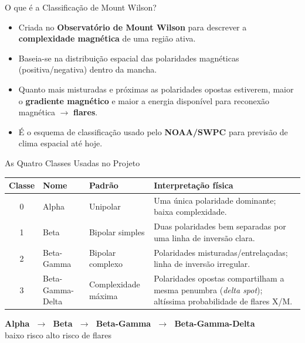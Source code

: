 \documentclass[aspectratio=169]{beamer}
\begin{document}
\begin{frame}{O que é a Classificação de Mount Wilson?}
  \begin{itemize}
    \item Criada no \textbf{Observatório de Mount Wilson} para descrever a \textbf{complexidade magnética} de uma região ativa.
    \item Baseia-se na distribuição espacial das polaridades magnéticas (positiva/negativa) dentro da mancha.
    \item Quanto mais misturadas e próximas as polaridades opostas estiverem, maior o \textbf{gradiente magnético} e maior a energia disponível para reconexão magnética $\rightarrow$ \textbf{flares}.
    \item É o esquema de classificação usado pelo \textbf{NOAA/SWPC} para previsão de clima espacial até hoje.
  \end{itemize}
\end{frame}

\begin{frame}{As Quatro Classes Usadas no Projeto}
  \begin{table}
    \small
    \begin{tabular}{c l l p{5.2cm}}
      \toprule
      \textbf{Classe} & \textbf{Nome} & \textbf{Padrão} & \textbf{Interpretação física} \\
      \midrule
      0 & Alpha & Unipolar & Uma única polaridade dominante; baixa complexidade. \\
      1 & Beta & Bipolar simples & Duas polaridades bem separadas por uma linha de inversão clara. \\
      2 & Beta-Gamma & Bipolar complexo & Polaridades misturadas/entrelaçadas; linha de inversão irregular. \\
      3 & Beta-Gamma-Delta & Complexidade máxima & Polaridades opostas compartilham a mesma penumbra (\emph{delta spot}); altíssima probabilidade de flares X/M. \\
      \bottomrule
    \end{tabular}
  \end{table}
  \vspace{0.3cm}
  \begin{center}
    \textbf{Alpha $\;\rightarrow\;$ Beta $\;\rightarrow\;$ Beta-Gamma $\;\rightarrow\;$ Beta-Gamma-Delta}\\
    \textcolor{magblue}{baixo risco} \hfill \textcolor{magred}{alto risco de flares}
  \end{center}
\end{frame}
\end{document}

